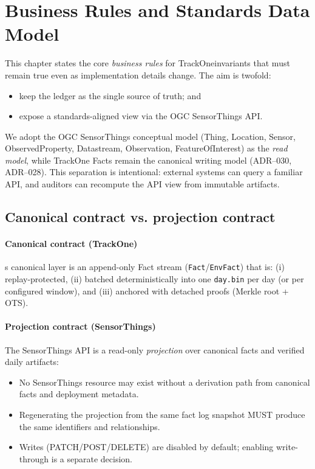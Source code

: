 \section{Business Rules and Standards Data Model}
\label{sec:business_rules}
This chapter states the core \emph{business rules} for TrackOne\textemdash{}invariants that must remain true even as implementation details change.
The aim is twofold:
\begin{itemize}[nosep]
  \item keep the ledger as the single source of truth; and
  \item expose a standards-aligned view via the \ac{OGC} SensorThings \ac{API}\@.
\end{itemize}

We adopt the \ac{OGC} SensorThings conceptual model (Thing, Location, Sensor, ObservedProperty, Datastream, Observation,
FeatureOfInterest) as the \emph{read model}, while TrackOne Facts remain the canonical writing model
(\ac{ADR}--030, \ac{ADR}--028).
This separation is intentional: external systems can query a familiar \ac{API}, and auditors can
recompute the \ac{API} view from immutable artifacts.

\subsection{Canonical contract vs. projection contract}
\label{subsec:canonical_vs_projection}

\paragraph{Canonical contract (TrackOne)}\textquotesingle s canonical layer is an append-only Fact stream (\texttt{Fact}/\texttt{EnvFact}) that is:
(i) replay-protected, (ii) batched deterministically into one \texttt{day.bin} per day (or per configured window), and
(iii) anchored with detached proofs (Merkle root + \ac{OTS}).

\paragraph{Projection contract (SensorThings)}
The SensorThings \ac{API} is a read-only \emph{projection} over canonical facts and verified daily artifacts:
\begin{itemize}[nosep]
  \item No SensorThings resource may exist without a derivation path from canonical facts and deployment metadata.
  \item Regenerating the projection from the same fact log snapshot MUST produce the same identifiers and relationships.
  \item Writes (PATCH/POST/DELETE) are disabled by default; enabling write-through is a separate decision.
\end{itemize}

